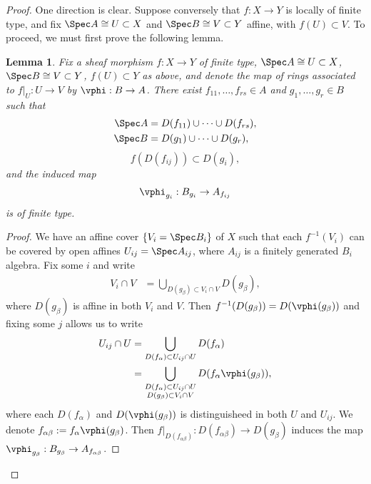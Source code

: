 \documentclass[12pt]{amsart}
\newtheorem*{lemma}{Lemma}
\begin{document}
\begin{proof}
  One direction is clear.
  Suppose conversely that $f:X\to Y$ is locally of finite type, and fix $\Spec A\cong U\subset X$ and $\Spec B\cong V\subset Y$ affine, with $f(U)\subset V$.
  To proceed, we must first prove the following lemma.

  \begin{lemma}
    Fix a sheaf morphism $f:X\to Y$ of finite type, $\Spec A\cong U\subset X$, $\Spec B\cong V\subset Y$, $f(U)\subset Y$ as above, and denote the map of rings associated to $f|_U:U\to V$ by $\vphi:B\to A$.
    There exist $f_{11},\ldots, f_{rs}\in A$ and $g_1,\ldots, g_r\in B$ such that
    \begin{align*}
      \Spec A &= D(f_{11})\cup\cdots \cup D(f_{rs}), \\
      \Spec B &= D(g_1)\cup \cdots \cup D(g_r),
    \end{align*}
    \[
      f(D(f_{ij}))\subset D(g_i),
    \] 
    and the induced map
    \begin{align*}
      \vphi_{g_i}: B_{g_i}\to A_{f_{ij}}
    \end{align*}
    is of finite type.
  \end{lemma}

  \begin{proof}
    We have an affine cover $\{V_i=\Spec B_i\}$ of $X$ such that each $f^{-1}(V_i)$ can be covered by open affines $U_{ij}=\Spec A_{ij}$, where $A_{ij}$ is a finitely generated $B_i$ algebra.
    Fix some $i$ and write
    \begin{align*}
      V_i\cap V &= \bigcup_{D(g_\beta)\subset V_i\cap V}D(g_\beta),
    \end{align*}
    where $D(g_\beta)$ is affine in both $V_i$ and $V$.
    Then $f^{-1}(D(g_\beta))=D(\vphi(g_\beta))$ and fixing some $j$ allows us to write
    \begin{align*}
      U_{ij}\cap U &= \bigcup_{D(f_\alpha)\subset U_{ij}\cap U}D(f_\alpha) \\
             &= \bigcup_{\substack{D(f_\alpha) \subset U_{ij}\cap U \\ D(g_\beta)\subset V_i\cap V}} 
             D(f_\alpha\vphi(g_\beta)),
    \end{align*}
    where each $D(f_\alpha)$ and $D(\vphi(g_\beta))$ is distinguisheed in both $U$ and $U_{ij}$.
    We denote $f_{\alpha\beta}:= f_{\alpha} \vphi(g_\beta)$.
    Then $f|_{D(f_{\alpha\beta})}:D(f_{\alpha\beta}) \to D(g_\beta)$ induces the map $\vphi_{g_\beta}: B_{g_\beta}\to A_{f_{\alpha\beta}}$.


\end{proof}
\end{proof}
\end{document}
